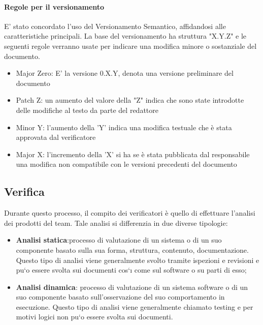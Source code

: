 \documentclass[12pt]{article}
\begin{document}
\paragraph{Regole per il versionamento}
\label{ver}
E' stato concordato l'uso del Versionamento Semantico, affidandosi alle caratteristiche principali.
La base del versionamento ha struttura "X.Y.Z" e le seguenti regole verranno usate per indicare una modifica minore o sostanziale del documento.
\begin{itemize}
    \item Major Zero: E' la versione 0.X.Y, denota una versione preliminare del documento
    \item Patch Z: un aumento del valore della "Z" indica che sono state introdotte delle modifiche al testo da parte del redattore
    \item Minor Y: l'aumento della 'Y' indica una modifica testuale che è stata approvata dal verificatore
    \item Major X: l'incremento della 'X' si ha se è stata pubblicata dal responsabile una modifica non compatibile con le versioni precedenti del documento
\end{itemize}


\subsection{Verifica}
Durante questo processo, il compito dei verificatori è quello di effettuare l’analisi dei prodotti del team.
Tale analisi si differenzia in due diverse tipologie:
\begin{itemize}
    \item \textbf{Analisi statica}:processo di valutazione di un sistema o di un suo componente basato sulla sua
    forma, struttura, contenuto, documentazione. Questo tipo di analisi viene generalmente svolto
    tramite ispezioni e revisioni e pu`o essere svolta sui documenti cos`ı come sul software o su parti
    di esso;
    
    \item \textbf{Analisi dinamica}: processo di valutazione di un sistema software o di un suo componente
    basato sull’osservazione del suo comportamento in esecuzione. Questo tipo di analisi viene
    generalmente chiamato testing e per motivi logici non pu`o essere svolta sui documenti.
\end{itemize}
\end{document}
